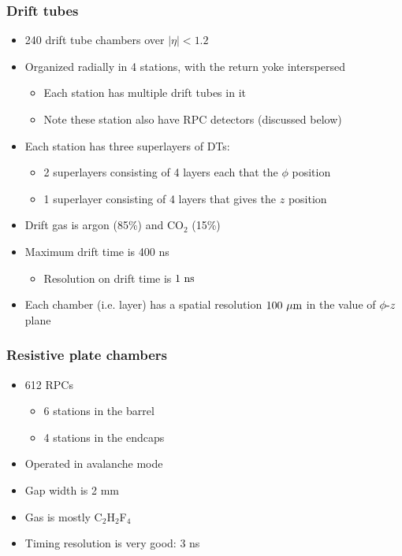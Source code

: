 \subsubsection{Drift tubes}
\begin{itemize}
  \item 240 drift tube chambers over $|\eta|<1.2$
  \item Organized radially in 4 stations, with the return yoke interspersed
  \begin{itemize}
    \item Each station has multiple drift tubes in it
    \item Note these station also have RPC detectors (discussed below)
  \end{itemize}
  \item Each station has three superlayers of DTs:
  \begin{itemize}
    \item 2 superlayers consisting of 4 layers each that the $\phi$ position
    \item 1 superlayer consisting of 4 layers that gives the $z$ position
  \end{itemize}
  \item Drift gas is argon (85\%) and CO$_2$ (15\%)
  \item Maximum drift time is 400 ns
  \begin{itemize}
    \item Resolution on drift time is $1~\text{ns}$
  \end{itemize}
  \item Each chamber (i.e. layer) has a spatial resolution $100~\mu\text{m}$ in the value of $\phi\textto z$  plane
\end{itemize}

\subsubsection{Resistive plate chambers}
\begin{itemize}
  \item 612 RPCs 
  \begin{itemize}
    \item 6 stations in the barrel
    \item 4 stations in the endcaps
  \end{itemize}
  \item Operated in avalanche mode
  \item Gap width is 2 mm
  \item Gas is mostly C$_2$H$_2$F$_4$
  \item Timing resolution is very good: 3 ns
\end{itemize}

